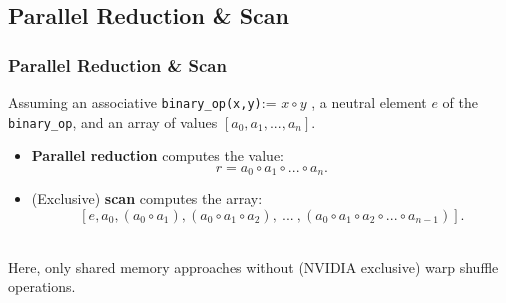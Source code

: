 \documentclass{beamer}
\begin{document}
\subsection{Parallel Reduction \& Scan}
\begin{frame}
\frametitle{Parallel Reduction \& Scan}
Assuming an associative \texttt{binary\_op(x,y)}:= $x \circ y$ , a neutral element $e$ of the \texttt{binary\_op}, and an array of values $\left[a_0,a_1, ... ,a_n\right]$.\\\vspace{10}
\begin{itemize}
  \item \textbf{Parallel reduction} computes the value:
\begin{equation}
  r = a_0 \circ a_1 \circ ... \circ a_n.
\end{equation}
\item (Exclusive) \textbf{scan} computes the array:
\begin{equation}
  \left[e , a_0 , \left(a_0 \circ a_1\right), \left(a_0 \circ a_1 \circ a_2\right), \ ... \ ,\left(a_0\circ a_1 \circ a_2 \circ ...\circ a_{n-1}\right)\right].
\end{equation}
\end{itemize}
\\\vspace{5}
Here, only shared memory approaches without (NVIDIA exclusive) warp shuffle operations.
\end{frame}
\end{document}
